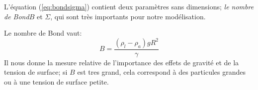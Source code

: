 
        L'équation (\ref{eq:bondsigma}) contient deux paramètres sans dimensions; \textit{le nombre de Bond}$B$ et $\Sigma$, qui sont très importants pour notre modélisation.

        Le nombre de Bond vaut:
        \begin{equation}
            B = \frac{(\rho_l-\rho_{a})gR^2}{\gamma}
        \end{equation}
        Il nous donne la mesure relative de l'importance des effets de gravité et de la tension de surface; si $B$ est tres grand, cela correspond à des particules grandes ou à une tension de surface petite. 




